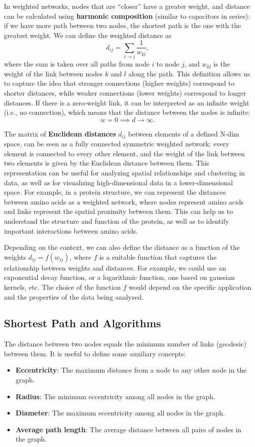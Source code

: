In weighted networks, nodes that are ``closer'' have a greater weight, and distance can be calculated using \textbf{harmonic composition} (similar to capacitors in series): if we have more path between two nodes, the shortest path is the one with the greatest weight. We can define the weighted distance as
\[
    d_{ij} = \sum_{i \to j} \frac{1}{w_{kl}},
\]
where the sum is taken over all paths from node \(i\) to node \(j\), and \(w_{kl}\) is the weight of the link between nodes \(k\) and \(l\) along the path. This definition allows us to capture the idea that stronger connections (higher weights) correspond to shorter distances, while weaker connections (lower weights) correspond to longer distances. If there is a zero-weight link, it can be interpreted as an infinite weight (i.e., no connection), which means that the distance between the nodes is infinite:
\[
    w = 0 \implies d \to \infty.
\]
\begin{example}
    The matrix of \textbf{Euclidean distances} \(d_{ij}\) between elements of a defined N-dim space, can be seen as a fully connected symmetric weighted network: every element is connected to every other element, and the weight of the link between two elements is given by the Euclidean distance between them. This representation can be useful for analyzing spatial relationships and clustering in data, as well as for visualizing high-dimensional data in a lower-dimensional space. For example, in a protein structure, we can represent the distances between amino acids as a weighted network, where nodes represent amino acids and links represent the spatial proximity between them. This can help us to understand the structure and function of the protein, as well as to identify important interactions between amino acids.

    Depending on the context, we can also define the distance as a function of the weights \(d_{ij} = f(w_{ij})\), where \(f\) is a suitable function that captures the relationship between weights and distances. For example, we could use an exponential decay function, or a logarithmic function, one based on gaussian kernels, etc. The choice of the function \(f\) would depend on the specific application and the properties of the data being analyzed.
\end{example}

\subsection{Shortest Path and Algorithms}
The distance between two nodes equals the minimum number of links (geodesic) between them. It is useful to define some auxiliary concepts:
\begin{itemize}
    \item \textbf{Eccentricity}: The maximum distance from a node to any other node in the graph.
    \item \textbf{Radius}: The minimum eccentricity among all nodes in the graph.
    \item \textbf{Diameter}: The maximum eccentricity among all nodes in the graph.
    \item \textbf{Average path length}: The average distance between all pairs of nodes in the graph.
\end{itemize}

